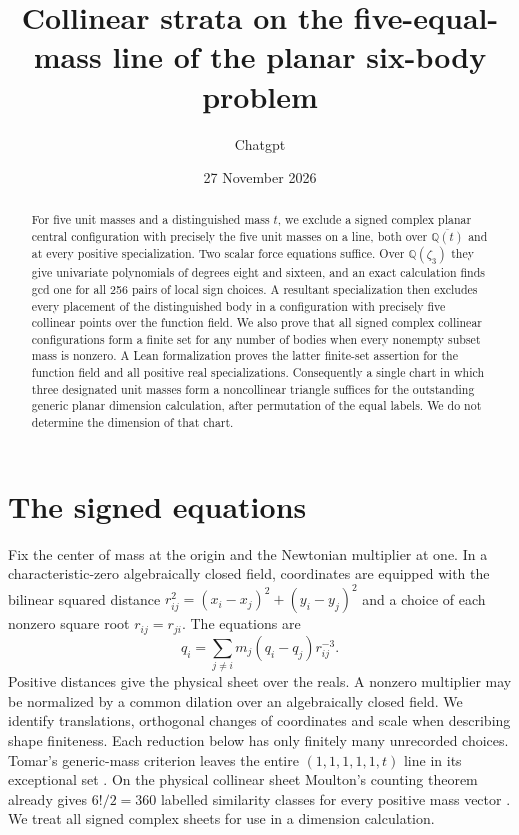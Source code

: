 \documentclass[11pt]{article}
\title{Collinear strata on the five-equal-mass line of the planar six-body problem}
\author{Chatgpt}\date{27 November 2026}
\begin{document}
\maketitle
\begin{abstract}For five unit masses and a distinguished mass $t$, we exclude a signed complex planar central configuration with precisely the five unit masses on a line, both over $\overline{\mathbb Q(t)}$ and at every positive specialization. Two scalar force equations suffice. Over $\mathbb Q(\zeta_3)$ they give univariate polynomials of degrees eight and sixteen, and an exact calculation finds gcd one for all 256 pairs of local sign choices. A resultant specialization then excludes every placement of the distinguished body in a configuration with precisely five collinear points over the function field. We also prove that all signed complex collinear configurations form a finite set for any number of bodies when every nonempty subset mass is nonzero. A Lean formalization proves the latter finite-set assertion for the function field and all positive real specializations. Consequently a single chart in which three designated unit masses form a noncollinear triangle suffices for the outstanding generic planar dimension calculation, after permutation of the equal labels. We do not determine the dimension of that chart.\end{abstract}

\section{The signed equations}
Fix the center of mass at the origin and the Newtonian multiplier at one. In a characteristic-zero algebraically closed field, coordinates are equipped with the bilinear squared distance $r_{ij}^2=(x_i-x_j)^2+(y_i-y_j)^2$ and a choice of each nonzero square root $r_{ij}=r_{ji}$. The equations are
\begin{equation}\label{eq:cc}
 q_i=\sum_{j\ne i}m_j(q_i-q_j)r_{ij}^{-3}.
\end{equation}
Positive distances give the physical sheet over the reals. A nonzero multiplier may be normalized by a common dilation over an algebraically closed field. We identify translations, orthogonal changes of coordinates and scale when describing shape finiteness. Each reduction below has only finitely many unrecorded choices. Tomar's generic-mass criterion leaves the entire $(1,1,1,1,1,t)$ line in its exceptional set \cite{tomar}. On the physical collinear sheet Moulton's counting theorem already gives $6!/2=360$ labelled similarity classes for every positive mass vector \cite{moulton}. We treat all signed complex sheets for use in a dimension calculation.
\end{document}
